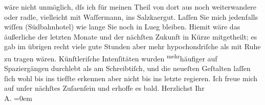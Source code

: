 \begin{ledgroupsized}[t]{13cm}
               wäre nicht unmöglich, dſs ich für meinen Theil von dort aus noch weiterwandere oder
               radle, vielleicht mit Waſſermann, ins Salzka{\geminationm}ergut. Laſſen Sie
               mich jedenfalls wiſſen (Südbahnhotel) wie lange Sie
               noch in Lueg bleiben. Hiemit wäre das äußerliche der
               letzten Monate und der nächſten Zukunft in Kürze mitgetheilt; es gab im übrigen recht
               viele gute Stunden aber mehr hypochondriſche als mit Ruhe zu tragen wären.
               Künſtleriſche Intenſitäten wurden \substVorne{}\textsuperscript{mehr}\substDazwischen{}häufiger\substHinten{} auf Spaziergängen durchlebt als am Schreibtiſch, und die neueſten Geſtalten
               laſſen ſich wohl bis ins tiefſte erkennen aber nicht bis ins letzte regieren. Ich
               freue mich auf unſer nächſtes Zuſa{\geminationm}enſein und erhoffe es
               bald.\pend
           \pstart
           Herzlichst Ihr{\\[\baselineskip]}\spacefill\mbox{A.}\pend
           \leftskip=0em{}\endnumbering{}\end{ledgroupsized}  \newcommand{\dateiname}{L01625}\newcommand{\titel}{Arthur Schnitzler an Hugo von Hofmannsthal, 8. 9. 1906}\newcommand{\editorInnen}{Martin Anton Müller und Gerd-Hermann Susen}
      